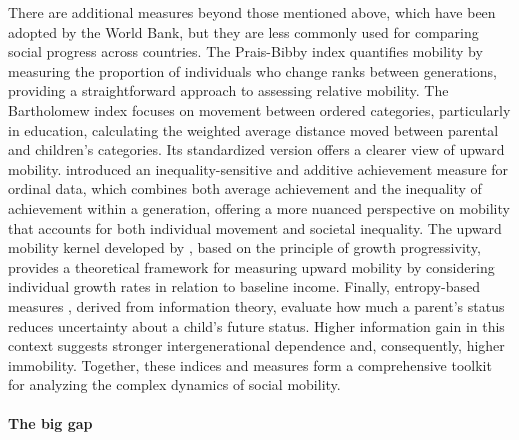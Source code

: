 There are additional measures beyond those mentioned above, which have been adopted by the World Bank, but they are less commonly used for comparing social progress across countries. The Prais-Bibby index \citep{bibby1975methods, prais1955measuring} quantifies mobility by measuring the proportion of individuals who change ranks between generations, providing a straightforward approach to assessing relative mobility. The Bartholomew index \citep{Bartholomew1967} focuses on movement between ordered categories, particularly in education, calculating the weighted average distance moved between parental and children's categories. Its standardized version offers a clearer view of upward mobility. \citet{apouey2023ordinal} introduced an inequality-sensitive and additive achievement measure for ordinal data, which combines both average achievement and the inequality of achievement within a generation, offering a more nuanced perspective on mobility that accounts for both individual movement and societal inequality. The upward mobility kernel developed by \citet{ray2023measuring}, based on the principle of growth progressivity, provides a theoretical framework for measuring upward mobility by considering individual growth rates in relation to baseline income. Finally, entropy-based measures \citep{mueller2021entropy}, derived from information theory, evaluate how much a parent’s status reduces uncertainty about a child's future status. Higher information gain in this context suggests stronger intergenerational dependence and, consequently, higher immobility. Together, these indices and measures form a comprehensive toolkit for analyzing the complex dynamics of social mobility.

\paragraph{The big gap}

